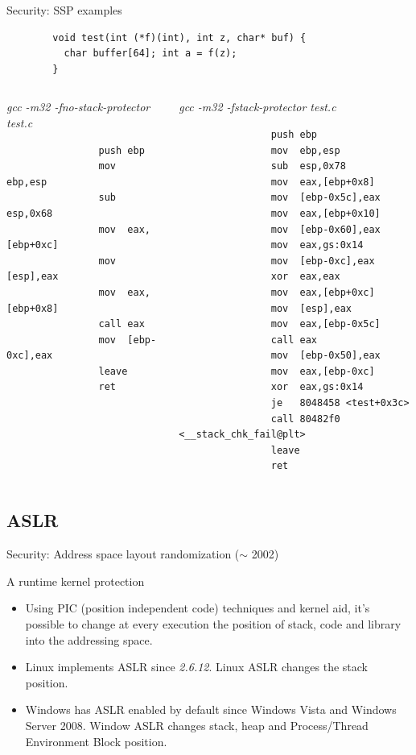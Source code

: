 \begin{frame}{Security: SSP examples}
	\ccode
	\begin{lstlisting}
		void test(int (*f)(int), int z, char* buf) {
		  char buffer[64]; int a = f(z);
		}
	\end{lstlisting}
	\vspace{-1cm}
	\begin{columns}[T]
		\begin{column}{.5\textwidth}
			{\small \emph{\alert{gcc -m32 -fno-stack-protector test.c}}}
			\acodenonu
			\begin{lstlisting}
				push ebp
				mov  ebp,esp
				sub  esp,0x68
				mov  eax,[ebp+0xc]
				mov  [esp],eax
				mov  eax,[ebp+0x8]
				call eax
				mov  [ebp-0xc],eax
				leave
				ret
			\end{lstlisting}
		\end{column}
		\begin{column}{.5\textwidth}
			{\small \emph{\alert{gcc -m32 -fstack-protector test.c}}}
			\acodenonu
			\begin{lstlisting}
				push ebp
				mov  ebp,esp
				sub  esp,0x78
				mov  eax,[ebp+0x8]
				mov  [ebp-0x5c],eax
				mov  eax,[ebp+0x10]
				mov  [ebp-0x60],eax
				mov  eax,gs:0x14
				mov  [ebp-0xc],eax
				xor  eax,eax
				mov  eax,[ebp+0xc]
				mov  [esp],eax
				mov  eax,[ebp-0x5c]
				call eax
				mov  [ebp-0x50],eax
				mov  eax,[ebp-0xc]
				xor  eax,gs:0x14
				je   8048458 <test+0x3c>
				call 80482f0 <__stack_chk_fail@plt>
				leave
				ret
			\end{lstlisting}
		\end{column}
	\end{columns}
\end{frame}

\subsection{ASLR}
\begin{frame}[fragile]{Security: Address space layout randomization ($\sim$ 2002)}
	\begin{block}{A runtime kernel protection}
		\begin{itemize}
			\item Using PIC (position independent code) techniques and kernel aid,
				it's possible to change at every execution the position of stack, code
				and library into the addressing space.
			\item Linux implements ASLR since \emph{2.6.12}. Linux ASLR changes the
				stack position.
			\item Windows has ASLR enabled by default since Windows Vista and Windows
				Server 2008. Window ASLR changes stack, heap and Process/Thread
				Environment Block position.
		\end{itemize}
	\end{block}
\end{frame}

